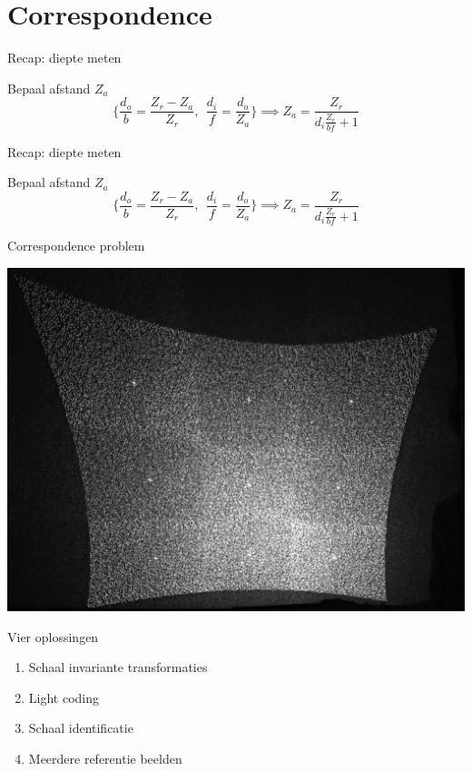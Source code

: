 \section{Correspondence}

\begin{frame}{Recap: diepte meten}
\centerline{}
\begin{block}{Bepaal afstand $Z_a$}
{\small \begin{equation*} 
    \{ \frac{d_o}{b} = \frac{Z_r - Z_a}{Z_r}, \ \ \frac{d_i}{f} = \frac{d_o}{Z_a} \} \implies Z_a = \frac{Z_r}{d_i \frac{Z_r}{b f} + 1}
\end{equation*}
}
\end{block}
\end{frame}

\begin{frame}{Recap: diepte meten}
\centerline{}
\begin{block}{Bepaal afstand $Z_a$}
{\small \begin{equation*} 
    \{ \frac{d_o}{b} = \frac{Z_r - Z_a}{Z_r}, \ \ \frac{d_i}{f} = \frac{d_o}{Z_a} \} \implies Z_a = \frac{Z_r}{d_i \frac{Z_r}{b f} + 1}
\end{equation*}
}
\end{block}
\end{frame}

\begin{frame}{Correspondence problem}
\centerline{\includegraphics[scale=0.15]{images/whole_pattern}}
\begin{block}{Vier oplossingen}
\begin{enumerate}
\item Schaal invariante transformaties
\item Light coding
\item Schaal identificatie
\item Meerdere referentie beelden
\end{enumerate}
\end{block}
\end{frame}


